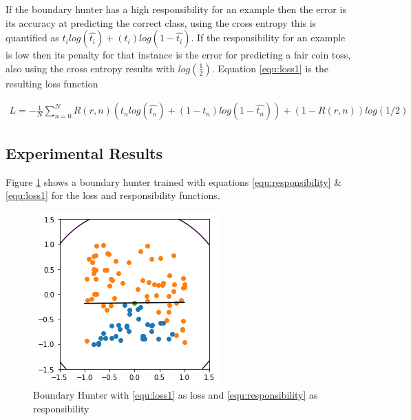 \documentclass[notitlepage]{report}
\theoremstyle{definition}
\begin{document}
If the boundary hunter has a high responsibility for an example then the error is its accuracy at predicting the correct class, using the cross entropy this is quantified as $t_i log(\widehat{t_i}) + (t_i)log(1 - \widehat{t_i})$. If the responsibility for an example is low then its penalty for that instance is the error for predicting a fair coin toss, also using the cross entropy results with $log(\frac{1}{2})$. Equation \ref{equ:loss1} is the resulting loss function

\begin{align}
L = -\frac{1}{N} \sum_{n=0}^N R(r, n) (t_n log(\widehat{t_n}) + (1-t_n)log(1 - \widehat{t_n})) + (1-R(r, n)) log(1/2)
\label{equ:loss1}
\end{align}

\subsection{Experimental Results}
Figure \ref{fig:boundaryhunter-l1-01} shows a boundary hunter trained with equations \ref{equ:responsibility} \& \ref{equ:loss1} for the loss and responsibility functions.

\begin{figure}[H]
\centering
  \begin{minipage}[b]{0.4\textwidth}
    \includegraphics[width=\textwidth]{BoundaryHunter-Attempt1-01.png}
    \caption{Boundary Hunter with \ref{equ:loss1} as loss and \ref{equ:responsibility} as responsibility}
    \label{fig:boundaryhunter-l1-01}
  \end{minipage}
  \hfill
\end{figure}
\end{document}
